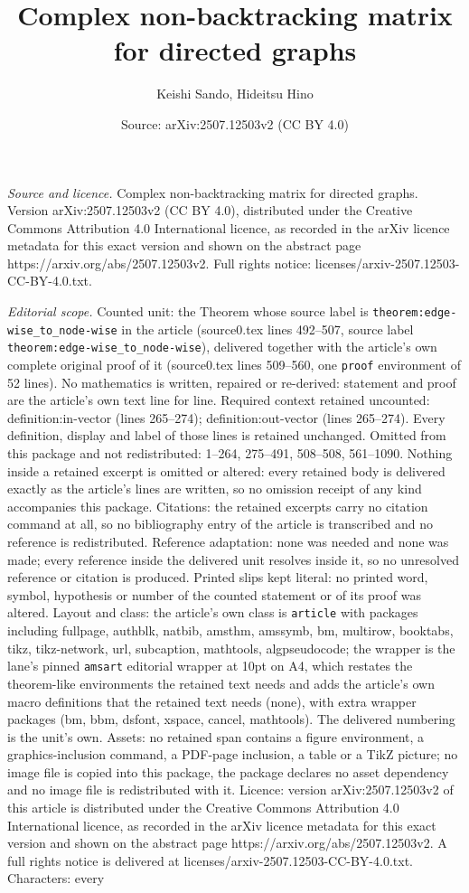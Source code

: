 \documentclass[10pt,a4paper]{amsart}
\title[Complex non-backtracking matrix for directed graphs]{Complex non-backtracking matrix for directed graphs}
\author{Keishi Sando, Hideitsu Hino}
\date{Source: arXiv:2507.12503v2 (CC BY 4.0)}
\begin{document}
\maketitle

\noindent\emph{Source and licence.} Complex non-backtracking matrix for directed graphs. Version arXiv:2507.12503v2 (CC BY 4.0), distributed under the Creative Commons Attribution 4.0 International licence, as recorded in the arXiv licence metadata for this exact version and shown on the abstract page https://arxiv.org/abs/2507.12503v2. Full rights notice: licenses/arxiv-2507.12503-CC-BY-4.0.txt.\par\smallskip

\noindent\textit{Editorial scope.} Counted unit: the Theorem whose source label is \texttt{theorem:edge-wise\_to\_node-wise} in the article (source0.tex lines 492--507, source label \texttt{theorem:edge-wise\_to\_node-wise}), delivered together with the article's own complete original proof of it (source0.tex lines 509--560, one \texttt{proof} environment of 52 lines). No mathematics is written, repaired or re-derived: statement and proof are the article's own text line for line. Required context retained uncounted: definition:in-vector (lines 265--274); definition:out-vector (lines 265--274). Every definition, display and label of those lines is retained unchanged. Omitted from this package and not redistributed: 1--264, 275--491, 508--508, 561--1090. Nothing inside a retained excerpt is omitted or altered: every retained body is delivered exactly as the article's lines are written, so no omission receipt of any kind accompanies this package. Citations: the retained excerpts carry no citation command at all, so no bibliography entry of the article is transcribed and no reference is redistributed. Reference adaptation: none was needed and none was made; every reference inside the delivered unit resolves inside it, so no unresolved reference or citation is produced. Printed slips kept literal: no printed word, symbol, hypothesis or number of the counted statement or of its proof was altered. Layout and class: the article's own class is \texttt{article} with packages including fullpage, authblk, natbib, amsthm, amssymb, bm, multirow, booktabs, tikz, tikz-network, url, subcaption, mathtools, algpseudocode; the wrapper is the lane's pinned \texttt{amsart} editorial wrapper at 10pt on A4, which restates the theorem-like environments the retained text needs and adds the article's own macro definitions that the retained text needs (none), with extra wrapper packages (bm, bbm, dsfont, xspace, cancel, mathtools). The delivered numbering is the unit's own. Assets: no retained span contains a figure environment, a graphics-inclusion command, a PDF-page inclusion, a table or a TikZ picture; no image file is copied into this package, the package declares no asset dependency and no image file is redistributed with it. Licence: version arXiv:2507.12503v2 of this article is distributed under the Creative Commons Attribution 4.0 International licence, as recorded in the arXiv licence metadata for this exact version and shown on the abstract page https://arxiv.org/abs/2507.12503v2. A full rights notice is delivered at licenses/arxiv-2507.12503-CC-BY-4.0.txt. Characters: every 
\end{document}
